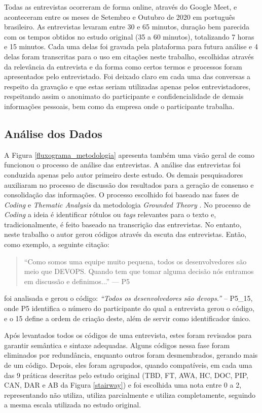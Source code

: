 Todas as entrevistas ocorreram de forma online, através do Google Meet, e aconteceram entre os meses de Setembro e Outubro de 2020 em português brasileiro. As entrevistas levaram entre 30 e 65 minutos, duração bem parecida com os tempos obtidos no estudo original (35 a 60 minutos), totalizando 7 horas e 15 minutos. Cada uma delas foi gravada pela plataforma para futura análise e 4 delas foram transcritas para o uso em citações neste trabalho, escolhidas através da relevância da entrevista e da forma como certos termos e processos foram apresentados pelo entrevistado. Foi deixado claro em cada uma das conversas a respeito da gravação e que estas seriam utilizadas apenas pelos entrevistadores, respeitando assim o anonimato do participante e confidencialidade de demais informações pessoais, bem como da empresa onde o participante trabalha.

\subsection{Análise dos Dados}
    
A Figura \ref{fluxograma_metodologia} apresenta também uma visão geral de como funcionou o processo de análise das entrevistas. A análise das entrevistas foi conduzida apenas pelo autor primeiro deste estudo. Os demais pesquisadores auxiliaram no processo de discussão dos resultados para a geração de consenso e consolidação das informações. O processo escolhido foi baseado nas fases de \emph{Coding} e \emph{Thematic Analysis} da metodologia \emph{Grounded Theory} \cite{groundedTheory}. No processo de \emph{Coding} a ideia é identificar rótulos ou \emph{tags} relevantes para o texto e, tradicionalmente, é feito baseado na transcrição das entrevistas. No entanto, neste trabalho o autor gerou códigos através da escuta das entrevistas. Então, como exemplo, a seguinte citação:

\begin{quote}
    ``Como somos uma equipe muito pequena, todos os desenvolvedores são meio que DEVOPS. Quando tem que tomar alguma decisão nós entramos em discussão e definimos...'' --- P5
\end{quote}
%
foi analisada e gerou o código: \emph{``Todos os desenvolvedores são devops.''} -- P5\_15, onde P5 identifica o número do participante do qual a entrevista gerou o código, e o 15 define a ordem de criação deste, além de servir como identificador único.

Após levantados todos os códigos de uma entrevista, estes foram revisados para garantir semântica e sintaxe adequadas. Alguns códigos nessa fase foram eliminados por redundância, enquanto outros foram desmembrados, gerando mais de um código. Depois, eles foram agrupados, quando compatíveis, em cada uma das 9 práticas descritas pelo estudo original (TBD, FT, AWA, HC, DOC, PIP, CAN, DAR e AB da Figura \ref{stairway}) e foi escolhida uma nota entre 0 a 2, representando não utiliza, utiliza parcialmente e utiliza completamente, seguindo a mesma escala utilizada no estudo original. 


